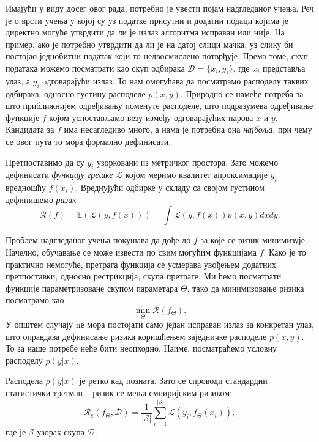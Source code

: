 \documentclass[12pt, a4paper, twoside]{book}
\numberwithin{equation}{chapter}
\numberwithin{theorem}{section}
\numberwithin{definition}{section}
\numberwithin{definitionChapter}{chapter}
\begin{document}
Имајући у виду досег овог рада, потребно је увести појам надгледаног учења. Реч је о врсти
учења у којој су уз податке присутни и додатни подаци којима је директно могуће утврдити
да ли је излаз алгоритма исправан или није. На пример, ако је потребно утврдити да ли је на
датој слици мачка, уз слику би постојао једнобитни податак који то недвосмислено потврђује.
Према томе, скуп података можемо посматрати као скуп одбирака $\mathcal{D}=\{x_i, y_i\}$,
где $x_i$ представља улаз, а $y_i$ oдговарајући излаз. То нам омогућава да посматрамо
расподелу таквих одбирака, односно густину расподеле $p(x, y)$. Природно се намеће потреба
за што приближнијем одређивању поменуте расподеле, што подразумева одређивање функције $f$
којом успостављамо везу између одговарајућих парова $x$ и $y$. Кандидата за $f$ има
несагледиво много, а нама је потребна она \textit{најбоља}, при чему се овог пута то мора
формално дефинисати.

Претпоставимо да су $y_i$ узорковани из метричког простора. Зато можемо дефинисати
\textit{функцију грешке} $\mathcal{L}$ којом меримо квалитет апроксимације $y_i$
вредношћу $f(x_i)$. Вреднујући одбирке у складу са својом густином дефинишемо \textit{ризик}
\begin{equation}
	\mathcal{R}(f) = \mathbb{E}(\mathcal{L}(y, f(x)))=\int\mathcal{L}(y, f(x))p(x, y)dxdy.
	\label{eqn-risk}
\end{equation}

Проблем надгледаног учења покушава да дође до $f$ за које се ризик минимизује. Начелно,
обучавање се може извести по свим могућим функцијама $f$. Како је то практично немогуће,
претрага функција се усмерава увођењем додатних претпоставки, односно рестрикција, скупа
претраге. Ми ћемо посматрати функције параметризоване скупом параметара $\Theta$,
тако да минимизовање ризика посматрамо као
\begin{equation}
	\min_{\Theta}\mathcal{R}(f_{\Theta}).
	\label{eqn-min-risk-theta}
\end{equation}
У општем случају nе мора постојати само један исправан излаз за конкретан улаз, што оправдава
дефинисање ризика коришћењем заједничке расподеле $p(x, y)$. То за наше потребе неће бити
неопходно. Наиме, посматраћемо условну расподелу $p(y\vert x)$.

Расподела $p(y\vert x)$ је ретко кад позната. Зато се спроводи стандардни статистички
третман -- ризик се мења емпиријским ризиком:
\begin{equation}
	\mathcal{R}_e(f_\Theta, \mathcal{D}) = \frac{1}{\vert \mathcal{S}\vert}\sum_{i=1}^{\vert \mathcal{S}\vert}\mathcal{L}(y_i, f_\Theta(x_i)),
\end{equation}
где је $\mathcal{S}$ узорак скупа $\mathcal{D}$.
\end{document}
